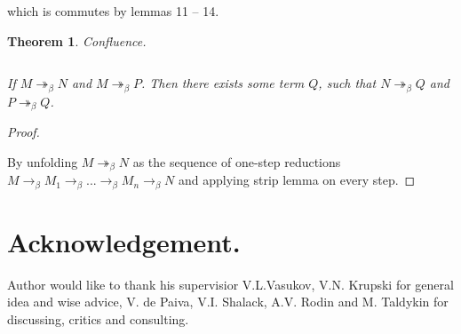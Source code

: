 \documentclass[a4paper]{article}
\newtheorem{theorem}{Theorem}
\begin{document}
which is commutes by lemmas 11 -- 14.

\begin{theorem} Confluence.

$ $

If $M \twoheadrightarrow_{\beta} N$ and $M \twoheadrightarrow_{\beta} P$. Then there exists some term $Q$,
such that $N \twoheadrightarrow_{\beta} Q$ and $P \twoheadrightarrow_{\beta} Q$.

\end{theorem}

\begin{proof}

$ $

  By unfolding $M \twoheadrightarrow_{\beta} N$ as the sequence of one-step reductions $M \rightarrow_{\beta}
  M_1 \rightarrow_{\beta} ... \rightarrow_{\beta} M_n \rightarrow_{\beta} N$ and applying strip lemma on every step.

\end{proof}

  \section{Acknowledgement.}

  Author would like to thank his supervisior
  V.L.Vasukov, V.N. Krupski for general idea and wise
  advice, V. de Paiva, V.I. Shalack, A.V. Rodin and M.
  Taldykin for discussing, critics and consulting.

\end{document}
